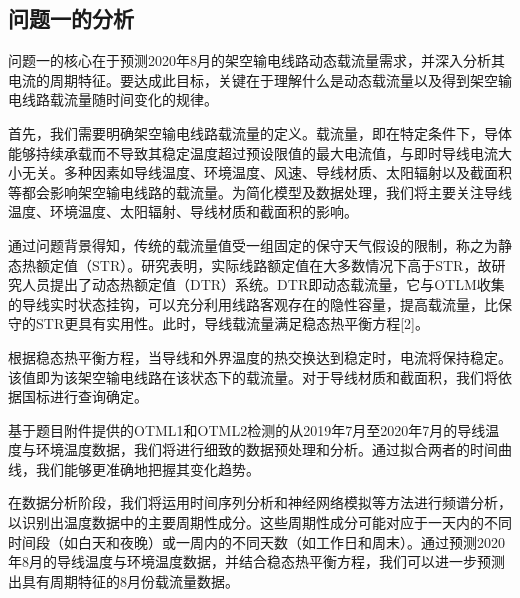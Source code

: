 \documentclass[a4paper,12.045pt]{ctexart}
\begin{document}
	\subsection{问题一的分析}
	问题一的核心在于预测2020年8月的架空输电线路动态载流量需求，并深入分析其电流的周期特征。要达成此目标，关键在于理解什么是动态载流量以及得到架空输电线路载流量随时间变化的规律。
	\par
	首先，我们需要明确架空输电线路载流量的定义。载流量，即在特定条件下，导体能够持续承载而不导致其稳定温度超过预设限值的最大电流值，与即时导线电流大小无关。多种因素如导线温度、环境温度、风速、导线材质、太阳辐射以及截面积等都会影响架空输电线路的载流量。为简化模型及数据处理，我们将主要关注导线温度、环境温度、太阳辐射、导线材质和截面积的影响。
	\par
	通过问题背景得知，传统的载流量值受一组固定的保守天气假设的限制，称之为静态热额定值（STR）。研究表明，实际线路额定值在大多数情况下高于STR，故研究人员提出了动态热额定值（DTR）系统。DTR即动态载流量，它与OTLM收集的导线实时状态挂钩，可以充分利用线路客观存在的隐性容量，提高载流量，比保守的STR更具有实用性。此时，导线载流量满足稳态热平衡方程[2]。
	\par
	根据稳态热平衡方程，当导线和外界温度的热交换达到稳定时，电流将保持稳定。该值即为该架空输电线路在该状态下的载流量。对于导线材质和截面积，我们将依据国标进行查询确定。
	\par
	基于题目附件提供的OTML1和OTML2检测的从2019年7月至2020年7月的导线温度与环境温度数据，我们将进行细致的数据预处理和分析。通过拟合两者的时间曲线，我们能够更准确地把握其变化趋势。
	\par
	在数据分析阶段，我们将运用时间序列分析和神经网络模拟等方法进行频谱分析，以识别出温度数据中的主要周期性成分。这些周期性成分可能对应于一天内的不同时间段（如白天和夜晚）或一周内的不同天数（如工作日和周末）。通过预测2020年8月的导线温度与环境温度数据，并结合稳态热平衡方程，我们可以进一步预测出具有周期特征的8月份载流量数据。
\end{document}
